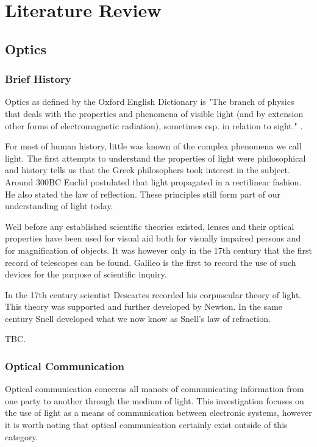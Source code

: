 \chapter{Literature Review}
\label{ch_literature}

\section{Optics}

\subsection{Brief History}
Optics as defined by the Oxford English Dictionary is "The branch of physics that deals with the properties and phenomena of visible light (and by extension other forms of electromagnetic radiation), sometimes esp. in relation to sight." \cite{oed}.

For most of human history, little was known of the complex phenomena we call light. The first attempts to understand the properties of light were philosophical and history tells us that the Greek philosophers took interest in the subject. Around 300BC Euclid postulated that light propagated in a rectilinear fashion. He also stated the law of reflection. These principles still form part of our understanding of light today. \cite{Vohnsen_2004}

Well before any established scientific theories existed, lenses and their optical properties have been used for visual aid both for visually impaired persons and for magnification of objects. It was however only in the 17th century that the first record of telescopes can be found. Galileo is the first to record the use of such devices for the purpose of scientific inquiry.

In the 17th century scientist Descartes recorded his corpuscular theory of light. This theory was supported and further developed by Newton. In the same century Snell developed what we now know as Snell's law of refraction.

TBC.

\subsection{Optical Communication}

Optical communication concerns all manors of communicating information from one party to another through the medium of light. This investigation focuses on the use of light as a means of communication between electronic systems, however it is worth noting that optical communication certainly exist outside of this category.

